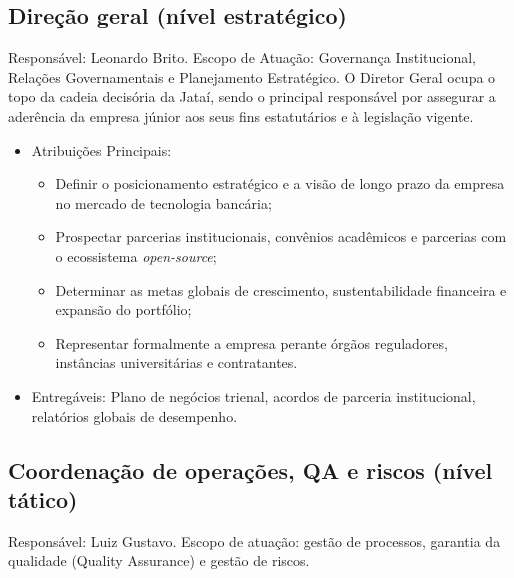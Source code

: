 \documentclass[
  12pt,
  openright,
  oneside,
  a4paper,
  brazilian
]{abntex2}
\begin{document}
\subsection{Direção geral (nível estratégico)}
{Responsável:} Leonardo Brito. {Escopo de Atuação:} Governança Institucional, Relações Governamentais e Planejamento Estratégico. O Diretor Geral ocupa o topo da cadeia decisória da Jataí, sendo o principal responsável por assegurar a aderência da empresa júnior aos seus fins estatutários e à legislação vigente.
\begin{itemize}
    \item Atribuições Principais:
    \begin{itemize}
        \item Definir o posicionamento estratégico e a visão de longo prazo da empresa no mercado de tecnologia bancária;
        \item Prospectar parcerias institucionais, convênios acadêmicos e parcerias com o ecossistema \textit{open-source};
        \item Determinar as metas globais de crescimento, sustentabilidade financeira e expansão do portfólio;
        \item Representar formalmente a empresa perante órgãos reguladores, instâncias universitárias e contratantes.
    \end{itemize}
    \item Entregáveis: Plano de negócios trienal, acordos de parceria institucional, relatórios globais de desempenho.
\end{itemize}

\subsection{Coordenação de operações, QA e riscos (nível tático)}
{Responsável:} Luiz Gustavo. {Escopo de atuação:} gestão de processos, garantia da qualidade (Quality Assurance) e gestão de riscos.
\end{document}
